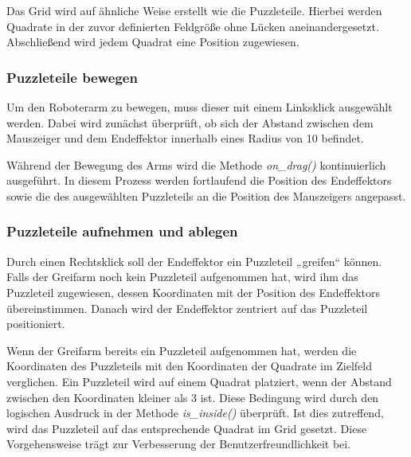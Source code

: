\documentclass[12pt]{article}
\begin{document}
    


    Das Grid wird auf ähnliche Weise erstellt wie die Puzzleteile. Hierbei werden Quadrate in der zuvor
    definierten Feldgröße ohne Lücken aneinandergesetzt. Abschließend wird jedem Quadrat eine Position
    zugewiesen.

    

    \subsubsection{Puzzleteile bewegen}
    Um den Roboterarm zu bewegen, muss dieser mit einem Linksklick ausgewählt werden. Dabei wird zunächst
    überprüft, ob sich der Abstand zwischen dem Mauszeiger und dem Endeffektor innerhalb eines Radius
    von 10 befindet.

    
    

    Während der Bewegung des Arms wird die Methode \textit{on\_drag()} kontinuierlich ausgeführt. In diesem
    Prozess werden fortlaufend die Position des Endeffektors sowie die des ausgewählten Puzzleteils an
    die Position des Mauszeigers angepasst.

    \newpage

    

    \subsubsection{Puzzleteile aufnehmen und ablegen}
    Durch einen Rechtsklick soll der Endeffektor ein Puzzleteil „greifen“ können. Falls der Greifarm noch
    kein Puzzleteil aufgenommen hat, wird ihm das Puzzleteil zugewiesen, dessen Koordinaten mit der
    Position des Endeffektors übereinstimmen. Danach wird der Endeffektor zentriert auf das Puzzleteil
    positioniert.

    Wenn der Greifarm bereits ein Puzzleteil aufgenommen hat, werden die Koordinaten des Puzzleteils mit
    den Koordinaten der Quadrate im Zielfeld verglichen. Ein Puzzleteil wird auf einem Quadrat platziert,
    wenn der Abstand zwischen den Koordinaten kleiner als 3 ist. Diese Bedingung wird durch den logischen
    Ausdruck in der Methode \textit{is\_inside()} überprüft. Ist dies zutreffend, wird das Puzzleteil auf das
    entsprechende Quadrat im Grid gesetzt. Diese Vorgehensweise trägt zur Verbesserung der
    Benutzerfreundlichkeit bei.
\end{document}
